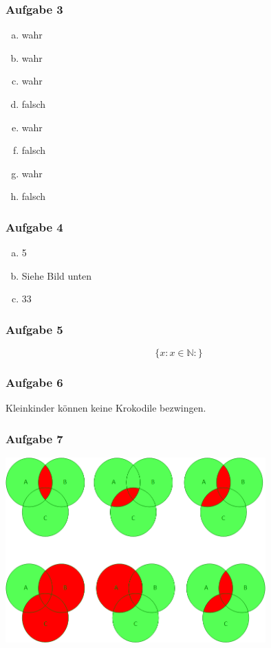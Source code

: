 \documentclass[12pt, a4paper, oneside]{article}
\begin{document}
\subsubsection{Aufgabe 3}
\begin{enumerate}[(a)]
  \item wahr
  \item wahr
  \item wahr
  \item falsch
  \item wahr
  \item falsch
  \item wahr
  \item falsch
\end{enumerate}

\subsubsection{Aufgabe 4} 
\begin{enumerate}[(a)]
  \item 5
  \item Siehe Bild unten
  \item 33
\end{enumerate}

\subsubsection{Aufgabe 5}
\begin{equation}
  \{x : x \in \mathbb{N} : \}
\end{equation}

\subsubsection{Aufgabe 6}
Kleinkinder können keine Krokodile bezwingen.

\subsubsection{Aufgabe 7} 
\begin{center}
  \includegraphics[width=0.75\textwidth]{ex3-7.png}
\end{center} 
 
\end{document}
